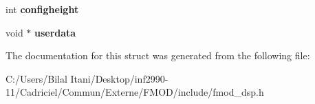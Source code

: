 \begin{DoxyCompactItemize}
\item 
int {\bfseries configheight}\hypertarget{struct_f_m_o_d___d_s_p___d_e_s_c_r_i_p_t_i_o_n_a896589017397442724a4e26a6aa2d921}{}\label{struct_f_m_o_d___d_s_p___d_e_s_c_r_i_p_t_i_o_n_a896589017397442724a4e26a6aa2d921}

\item 
void $\ast$ {\bfseries userdata}\hypertarget{struct_f_m_o_d___d_s_p___d_e_s_c_r_i_p_t_i_o_n_a1610f0c65c07582271120060e36e9d87}{}\label{struct_f_m_o_d___d_s_p___d_e_s_c_r_i_p_t_i_o_n_a1610f0c65c07582271120060e36e9d87}

\end{DoxyCompactItemize}


The documentation for this struct was generated from the following file\+:\begin{DoxyCompactItemize}
\item 
C\+:/\+Users/\+Bilal Itani/\+Desktop/inf2990-\/11/\+Cadriciel/\+Commun/\+Externe/\+F\+M\+O\+D/include/fmod\+\_\+dsp.\+h\end{DoxyCompactItemize}
